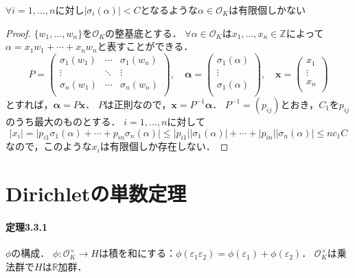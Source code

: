 \begin{screen}
  \begin{lem}
    \label{place_restricted_is_finite}
    $\forall i=1,\ldots,n$に対し$\lvert\sigma_i(\alpha)\rvert< C$となるような$\alpha\in\mathcal{O}_K$は有限個しかない
  \end{lem}
\end{screen}
\begin{proof}
  $\{w_1,\ldots,w_n\}$を$\mathcal{O}_K$の整基底とする．
  $\forall\alpha\in\mathcal{O}_K$は$x_1,\ldots,x_n\in\mathbb{Z}$によって$\alpha=x_1w_1+\cdots+x_nw_n$と表すことができる．
  \[P=
  \begin{pmatrix}
    \sigma_1(w_1) & \cdots & \sigma_1(w_n)\\
    \vdots & \ddots & \vdots \\
    \sigma_n(w_1) & \cdots & \sigma_n(w_n)\\
  \end{pmatrix}
  ,\quad\boldsymbol\alpha=
  \begin{pmatrix}
    \sigma_1(\alpha)\\
    \vdots\\
    \sigma_1(\alpha)\\
  \end{pmatrix}
  ,\quad\boldsymbol x=
  \begin{pmatrix}
    x_1\\
    \vdots\\
    x_n\\
  \end{pmatrix}
  \]
  とすれば，$\boldsymbol\alpha=P\boldsymbol x$．
  $P$は正則なので，$\boldsymbol x=P^{-1}\boldsymbol\alpha$．
  $P^{-1}=(p_{ij})$とおき，$C_1$を$p_{ij}$のうち最大のものとする．
  $i=1,\ldots,n$に対して
  \[\lvert x_i\rvert=\lvert p_{i1}\sigma_1(\alpha)+\cdots+p_{in}\sigma_n(\alpha)\rvert\leq\lvert p_{i1}\rvert\lvert\sigma_1(\alpha)\rvert+\cdots+\lvert p_{in}\rvert\lvert\sigma_n(\alpha)\rvert\leq nc_1C\]
  なので，このような$x_i$は有限個しか存在しない．
\end{proof}

\section{Dirichletの単数定理}
\paragraph{定理3.3.1}
$\phi$の構成．
$\phi\colon\mathcal{O}_K^\times\to H$は積を和にする：$\phi(\varepsilon_1\varepsilon_2)=\phi(\varepsilon_1)+\phi(\varepsilon_2)$．
$\mathcal{O}_K^\times$は乗法群で$H$は$\mathbb{R}$加群．

